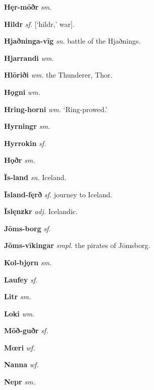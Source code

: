 \documentclass[12pt,letterpaper]{book}
\begin{document}
\noindent
\textbf{Hęr-mōðr} \textit{sm.} 

\noindent
\textbf{Hildr} \textit{sf.} [`hildr,' war].

\noindent
\textbf{Hjaðninga-vīg} \textit{sn.} battle of the Hjaðnings.

\noindent
\textbf{Hjarrandi} \textit{wm.} 

\noindent
\textbf{Hlōriði} \textit{wm.} the Thunderer, Thor.

\noindent
\textbf{Hǫgni} \textit{wm.} 

\noindent
\textbf{Hring-horni} \textit{wm.} `Ring-prowed.'

\noindent
\textbf{Hyrningr} \textit{sm.} 

\noindent
\textbf{Hyrrokin} \textit{sf.} 

\noindent
\textbf{Hǫðr} \textit{sm.} 

\vspace{\baselineskip}

\noindent
\textbf{Īs-land} \textit{sn.} Iceland.

\noindent
\textbf{Īsland-fęrð} \textit{sf.} journey to Iceland.

\noindent
\textbf{Īslęnzkr} \textit{adj.} Icelandic.

\vspace{\baselineskip}

\noindent
\textbf{Jōms-borg} \textit{sf.} 

\noindent
\textbf{Jōms-vīkingar} \textit{smpl.} the pirates of Jōmsborg.

\vspace{\baselineskip}

\noindent
\textbf{Kol-bjǫrn} \textit{sm.} 

\vspace{\baselineskip}

\noindent
\textbf{Laufey} \textit{sf.} 

\noindent
\textbf{Litr} \textit{sm.} 

\noindent
\textbf{Loki} \textit{wm.} 

\vspace{\baselineskip}

\noindent
\textbf{Mōð-guðr} \textit{sf.} 

\noindent
\textbf{Mœri} \textit{wf.} 

\vspace{\baselineskip}

\noindent
\textbf{Nanna} \textit{wf.} 

\noindent
\textbf{Nepr} \textit{sm.} 
\end{document}

